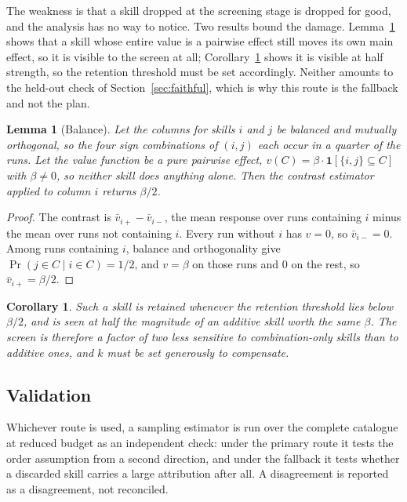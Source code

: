 \documentclass[11pt]{article}
\theoremstyle{plain}
\newtheorem{lemma}[theorem]{Lemma}
\newtheorem{corollary}[theorem]{Corollary}
\theoremstyle{definition}
\theoremstyle{remark}
\begin{document}
The weakness is that a skill dropped at the screening stage is dropped for good, and the analysis has no way to notice. Two results bound the damage. Lemma~\ref{lem:balance} shows that a skill whose entire value is a pairwise effect still moves its own main effect, so it is visible to the screen at all; Corollary~\ref{cor:screen} shows it is visible at half strength, so the retention threshold must be set accordingly. Neither amounts to the held-out check of Section~\ref{sec:faithful}, which is why this route is the fallback and not the plan.

\begin{lemma}[Balance]\label{lem:balance}
Let the columns for skills $i$ and $j$ be balanced and mutually orthogonal, so the four sign combinations of $(i,j)$ each occur in a quarter of the runs. Let the value function be a pure pairwise effect, $v(C) = \beta \cdot \mathbf{1}[\{i,j\} \subseteq C]$ with $\beta \neq 0$, so neither skill does anything alone. Then the contrast estimator applied to column $i$ returns $\beta/2$.
\end{lemma}

\begin{proof}
The contrast is $\bar v_{i+} - \bar v_{i-}$, the mean response over runs containing $i$ minus the mean over runs not containing $i$. Every run without $i$ has $v = 0$, so $\bar v_{i-} = 0$. Among runs containing $i$, balance and orthogonality give $\Pr(j \in C \mid i \in C) = 1/2$, and $v = \beta$ on those runs and $0$ on the rest, so $\bar v_{i+} = \beta/2$.
\end{proof}

\begin{corollary}\label{cor:screen}
Such a skill is retained whenever the retention threshold lies below $\beta/2$, and is seen at half the magnitude of an additive skill worth the same $\beta$. The screen is therefore a factor of two less sensitive to combination-only skills than to additive ones, and $k$ must be set generously to compensate.
\end{corollary}

\subsection{Validation}
\label{sec:validation}

Whichever route is used, a sampling estimator \cite{castro} is run over the complete catalogue at reduced budget as an independent check: under the primary route it tests the order assumption from a second direction, and under the fallback it tests whether a discarded skill carries a large attribution after all. A disagreement is reported as a disagreement, not reconciled.
\end{document}
